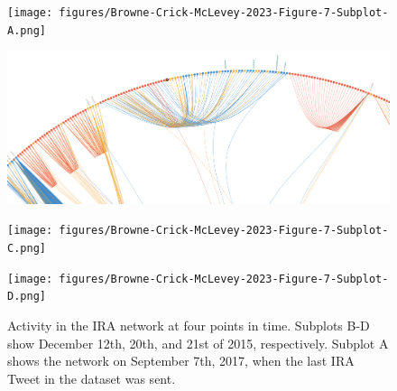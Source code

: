 \documentclass[
  12pt,
  a4paper,
  DIV=11,
  numbers=noendperiod,
  twoside,
  open=any]{scrartcl}
\begin{document}
\begin{figure}

\begin{minipage}{0.50\linewidth}

\captionsetup{labelsep=none}\texttt{[image: figures/Browne-Crick-McLevey-2023-Figure-7-Subplot-A.png]}

\subcaption{\label{fig-ira1}}

\end{minipage}%
%
\begin{minipage}{0.50\linewidth}

\captionsetup{labelsep=none}\includegraphics{figures/Browne-Crick-McLevey-2023-Figure-8-Subplot-B.png}

\subcaption{\label{fig-ira2}}

\end{minipage}%
\newline
\begin{minipage}{0.50\linewidth}

\captionsetup{labelsep=none}\texttt{[image: figures/Browne-Crick-McLevey-2023-Figure-7-Subplot-C.png]}

\subcaption{\label{fig-ira3}}

\end{minipage}%
%
\begin{minipage}{0.50\linewidth}

\captionsetup{labelsep=none}\texttt{[image: figures/Browne-Crick-McLevey-2023-Figure-7-Subplot-D.png]}

\subcaption{\label{fig-ira3}}

\end{minipage}%

\caption{\label{fig-7}Activity in the IRA network at four points in
time. Subplots B-D show December 12th, 20th, and 21st of 2015,
respectively. Subplot A shows the network on September 7th, 2017, when
the last IRA Tweet in the dataset was sent.}

\end{figure}%
\end{document}
